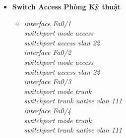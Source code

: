 \documentclass[12pt,a4paper]{report}
\begin{document}
\begin{itemize}
\begin{itemize}
\begin{itemize}
    \end{itemize}
     \item \textbf{Switch Access Phòng Kỹ thuật}
     \begin{itemize}
      \item \textit{interface Fa0/1\\
switchport mode access\\
switchport access vlan 22\\
interface Fa0/2\\
switchport mode access\\
switchport access vlan 22\\
interface Fa0/3\\
switchport mode trunk\\
switchport trunk native vlan 111\\
interface Fa0/4\\
switchport mode trunk\\
switchport trunk native vlan 111\\}
     
    \end{itemize}

   \end{itemize}
\end{itemize}
\end{document}

